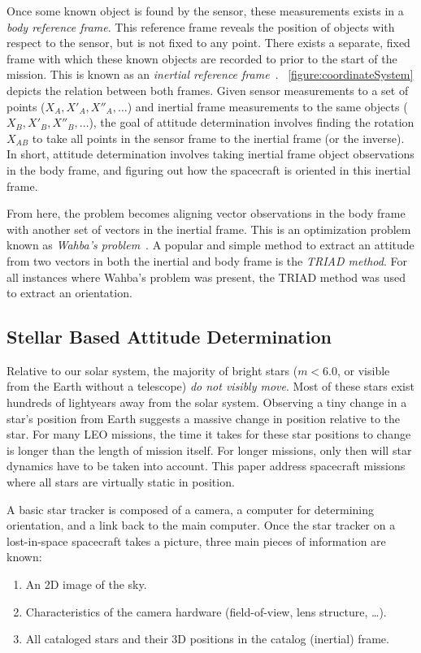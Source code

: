 Once some known object is found by the sensor, these measurements exists in a \textit{body reference frame}.
This reference frame reveals the position of objects with respect to the sensor, but is not fixed to any point.
There exists a separate, fixed frame with which these known objects are recorded to prior to the start of the mission.
This is known as an \textit{inertial reference frame}~\cite{Tappe}.
~\autoref{figure:coordinateSystem} depicts the relation between both frames.
Given sensor measurements to a set of points ($X_A, X'_A, X''_A, \ldots$) and inertial frame measurements to the same
objects ($X_B, X'_B, X''_B, \ldots$), the goal of attitude determination involves finding the rotation $X_{AB}$ to
take all points in the sensor frame to the inertial frame (or the inverse).
In short, attitude determination involves taking inertial frame object observations in the body frame, and figuring out
how the spacecraft is oriented in this inertial frame.

From here, the problem becomes aligning vector observations in the body frame with another set of vectors in the
inertial frame.
This is an optimization problem known as \textit{Wahba's problem}~\cite{AttitudeEstimation}.
A popular and simple method to extract an attitude from two vectors in both the inertial and body frame is the
\textit{TRIAD method}.
For all instances where Wahba's problem was present, the TRIAD method was used to extract an orientation.

\subsection{Stellar Based Attitude Determination}\label{subsec:stellarBasedAttitudeDetermination}
Relative to our solar system, the majority of bright stars ($m < 6.0$, or visible from the Earth without a telescope)
\textit{do not visibly move}.
Most of these stars exist hundreds of lightyears away from the solar system.
Observing a tiny change in a star's position from Earth suggests a massive change in position relative to the star.
For many LEO missions, the time it takes for these star positions to change is longer than the length of mission itself.
For longer missions, only then will star dynamics have to be taken into account.
This paper address spacecraft missions where all stars are virtually static in position.

A basic star tracker is composed of a camera, a computer for determining orientation, and a link back to the main
computer.
Once the star tracker on a lost-in-space spacecraft takes a picture, three main pieces of information are known:
\begin{enumerate}
    \item An 2D image of the sky.
    \item Characteristics of the camera hardware (field-of-view, lens structure, \ldots).
    \item All cataloged stars and their 3D positions in the catalog (inertial) frame.
\end{enumerate}

